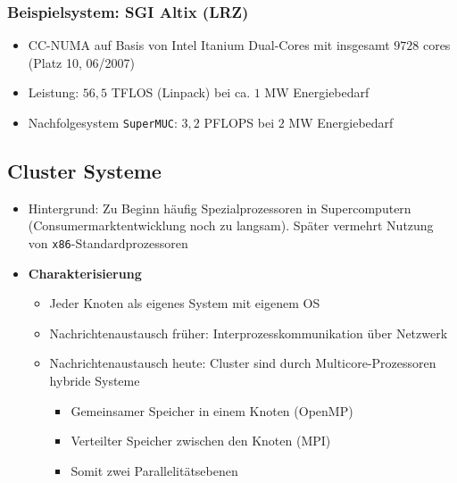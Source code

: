 \subsubsection{Beispielsystem: SGI Altix (LRZ)}
\begin{itemize}
	\item CC-NUMA auf Basis von Intel Itanium Dual-Cores mit insgesamt \(9728\) cores (Platz 10, 06/2007)
	\item Leistung: \(56,5\) TFLOS (Linpack) bei ca. \(1\) MW Energiebedarf
	\item Nachfolgesystem \texttt{SuperMUC}: \(3,2\) PFLOPS bei \(2\) MW Energiebedarf
\end{itemize}


\subsection{Cluster Systeme}
\begin{itemize}
	\item Hintergrund: Zu Beginn häufig Spezialprozessoren in Supercomputern (Consumermarktentwicklung noch zu langsam). Später vermehrt Nutzung von \texttt{x86}-Standardprozessoren
	\item \textbf{Charakterisierung}
	\begin{itemize}
		\item Jeder Knoten als eigenes System mit eigenem OS
		\item Nachrichtenaustausch früher: Interprozesskommunikation über Netzwerk
		\item Nachrichtenaustausch heute: Cluster sind durch Multicore-Prozessoren hybride Systeme
		\begin{itemize}
			\item Gemeinsamer Speicher in einem Knoten (OpenMP)
			\item Verteilter Speicher zwischen den Knoten (MPI)
			\item Somit zwei Parallelitätsebenen
		\end{itemize}
	\end{itemize}
\end{itemize}

